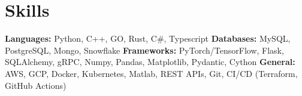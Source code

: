 \vspace{5 pt - 0.3 cm}
\section{Skills}
\begin{onecolentry}
    \textbf{Languages:} Python, C++, GO, Rust, C\#, Typescript \newline
    \textbf{Databases:} MySQL, PostgreSQL, Mongo, Snowflake \newline
    \textbf{Frameworks:} PyTorch/TensorFlow, Flask, SQLAlchemy, gRPC, Numpy, Pandas, Matplotlib, Pydantic, Cython   \newline
    \textbf{General:} AWS, GCP, Docker, Kubernetes, Matlab, REST APIs, Git, CI/CD (Terraform, GitHub Actions) \newline
\end{onecolentry}